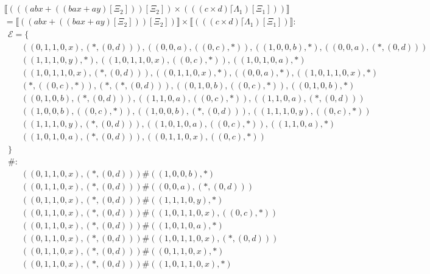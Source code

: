 \begin{align*} 
	 &  & \\ 
	 & \llbracket (((abx + ((bax + ay) [\Xi_2])) [\Xi_2]) \times (((c \times d) \lceil \Lambda_1) [\Xi_1])) \rrbracket & \\ 
	 & = \llbracket ((abx + ((bax + ay) [\Xi_2])) [\Xi_2]) \rrbracket \times \llbracket (((c \times d) \lceil \Lambda_1) [\Xi_1]) \rrbracket:  & \\ 
	 & \ \ \mathcal{{E}}= \{  & \\ 
	 & \qquad ((0, 1, 1, 0, x), (*, (0, d))), ((0, 0, a), ((0, c), *)), ((1, 0, 0, b), *), ((0, 0, a), (*, (0, d))) \\ 
	 & \qquad ((1, 1, 1, 0, y), *), ((1, 0, 1, 1, 0, x), ((0, c), *)), ((1, 0, 1, 0, a), *) \\ 
	 & \qquad ((1, 0, 1, 1, 0, x), (*, (0, d))), ((0, 1, 1, 0, x), *), ((0, 0, a), *), ((1, 0, 1, 1, 0, x), *) \\ 
	 & \qquad (*, ((0, c), *)), (*, (*, (0, d))), ((0, 1, 0, b), ((0, c), *)), ((0, 1, 0, b), *) \\ 
	 & \qquad ((0, 1, 0, b), (*, (0, d))), ((1, 1, 0, a), ((0, c), *)), ((1, 1, 0, a), (*, (0, d))) \\ 
	 & \qquad ((1, 0, 0, b), ((0, c), *)), ((1, 0, 0, b), (*, (0, d))), ((1, 1, 1, 0, y), ((0, c), *)) \\ 
	 & \qquad ((1, 1, 1, 0, y), (*, (0, d))), ((1, 0, 1, 0, a), ((0, c), *)), ((1, 1, 0, a), *) \\ 
	 & \qquad ((1, 0, 1, 0, a), (*, (0, d))), ((0, 1, 1, 0, x), ((0, c), *)) \\ 
	 & \ \ \} & \\ 
	 & \ \ \#: & \\ 
	 & \qquad ((0, 1, 1, 0, x), (*, (0, d))) \# ((1, 0, 0, b), *) \\ 
	 & \qquad ((0, 1, 1, 0, x), (*, (0, d))) \# ((0, 0, a), (*, (0, d))) \\ 
	 & \qquad ((0, 1, 1, 0, x), (*, (0, d))) \# ((1, 1, 1, 0, y), *) \\ 
	 & \qquad ((0, 1, 1, 0, x), (*, (0, d))) \# ((1, 0, 1, 1, 0, x), ((0, c), *)) \\ 
	 & \qquad ((0, 1, 1, 0, x), (*, (0, d))) \# ((1, 0, 1, 0, a), *) \\ 
	 & \qquad ((0, 1, 1, 0, x), (*, (0, d))) \# ((1, 0, 1, 1, 0, x), (*, (0, d))) \\ 
	 & \qquad ((0, 1, 1, 0, x), (*, (0, d))) \# ((0, 1, 1, 0, x), *) \\ 
	 & \qquad ((0, 1, 1, 0, x), (*, (0, d))) \# ((1, 0, 1, 1, 0, x), *) \\ 

\end{align*}
